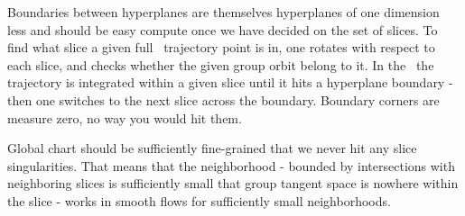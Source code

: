 \documentclass[aip,cha,graphicx]{revtex4-1}
\begin{document}
Boundaries
between hyperplanes are themselves hyperplanes of one dimension less and
should be easy compute once we have decided on the set of slices. To find
what slice a given full \statesp\ trajectory point is in, one rotates
with respect to each slice, and checks whether the given group orbit
belong to it. In the \reducedsp\ the trajectory is integrated within a
given slice until it hits a hyperplane boundary - then one switches to
the next slice across the boundary. Boundary corners are measure zero, no
way you would hit them.

Global chart should be sufficiently fine-grained that we never hit any
slice singularities. That means that the neighborhood - bounded by
intersections with neighboring slices is sufficiently small that group
tangent space is nowhere within the slice - works in smooth flows
for sufficiently small neighborhoods.

\subsection{}
\subsubsection{}


%

%
\end{document}

